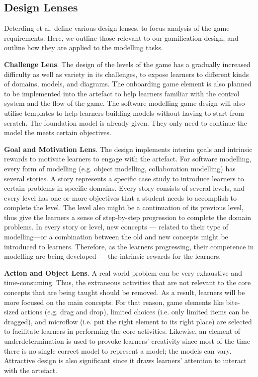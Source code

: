 \documentclass[runningheads,a4paper]{llncs}
\begin{document}
\subsection{Design Lenses}
Deterding et al.  \cite{deterding2015lens} define various design lenses, to focus analysis of the game requirements.  Here, we outline those relevant to our gamification design, and outline how they are applied to the modelling tasks.

\textbf{Challenge Lens}. The design of the levels of the game has a gradually increased difficulty as well as variety in its challenges, to expose learners to different kinds of domains, models, and diagrams. The onboarding game element is also planned to be implemented into the artefact to help learners familiar with the control system and the flow of the game. The software modelling game design will also utilise templates to help learners building models without having to start from scratch. The foundation model is already given. They only need to continue the model the meets certain objectives.

\textbf{Goal and Motivation Lens}. The design implements interim goals and intrinsic rewards to motivate learners to engage with the artefact. For software modelling, every form of modelling (e.g. object modelling, collaboration modelling) has several stories. A story represents a specific case study to introduce learners to certain problems in specific domains. Every story consists of several levels, and every level has one or more objectives that a student needs to accomplish to complete the level. The level also might be a continuation of its previous level, thus give the learners a sense of step-by-step progression to complete the domain problems. In every story or level, new concepts --- related to their type of modelling---or a combination between the old and new concepts might be introduced to learners. Therefore, as the learners progressing, their competence in modelling are being developed --- the intrinsic rewards for the learners. 

\textbf{Action and Object Lens}. A real world problem  can be very exhaustive and time-consuming. Thus, the extraneous activities that are not relevant to the core concepts that are being taught should be removed. As a result, learners will be more focused on the main concepts. For that reason, game elements like bite-sized actions (e.g. drag and drop), limited choices (i.e. only limited items can be dragged), and microflow (i.e. put the right element to its right place) are selected to facilitate learners in performing the core activities. Likewise, an element of underdetermination is used to provoke learners' creativity since most of the time there is no single correct model to represent a model; the models can vary. Attractive design is also significant since it draws learners' attention to interact with the artefact.
\end{document}
